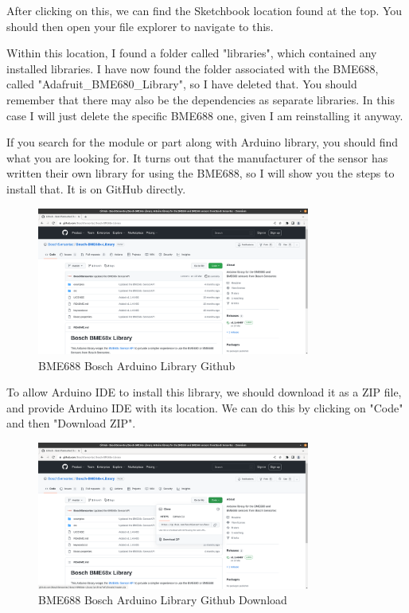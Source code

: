 \documentclass[a4paper,11pt]{report}
\begin{document}
After clicking on this, we can find the Sketchbook location found at the top. You should then open your file explorer to navigate to this.

Within this location, I found a folder called "libraries", which contained any installed libraries. I have now found the folder associated with the BME688, called "Adafruit\_BME680\_Library", so I have deleted that. You should remember that there may also be the dependencies as separate libraries. In this case I will just delete the specific BME688 one, given I am reinstalling it anyway.

If you search for the module or part along with Arduino library, you should find what you are looking for. It turns out that the manufacturer of the sensor has written their own library for using the BME688, so I will show you the steps to install that. It is on GitHub directly.

\begin{figure}[H]
\centering
\includegraphics[width=0.8\textwidth]{screenshots/boscharduinolibrarygithub}
\caption{BME688 Bosch Arduino Library Github}
\end{figure}

To allow Arduino IDE to install this library, we should download it as a ZIP file, and provide Arduino IDE with its location. We can do this by clicking on "Code" and then "Download ZIP".

\begin{figure}[H]
\centering
\includegraphics[width=0.8\textwidth]{screenshots/boscharduinolibrarygithubdownload}
\caption{BME688 Bosch Arduino Library Github Download}
\end{figure}
\end{document}
